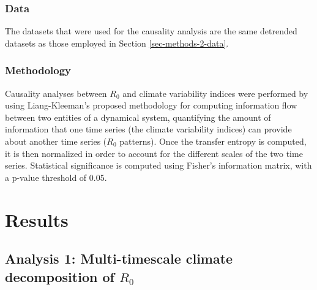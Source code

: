 \documentclass[10pt,twocolumn]{wlscirep}
\begin{document}
\subsubsection{Data} \label{sec-methods-3-data}

The datasets that were used for the causality analysis are the same detrended datasets as those employed in Section \ref{sec-methods-2-data}.

\subsubsection{Methodology} \label{sec-methods-3-methodology}

Causality analyses between $R_0$ and climate variability indices were performed by using Liang-Kleeman's proposed methodology for computing information flow between two entities of a dynamical system, quantifying the amount of information that one time series (the climate variability indices) can provide about another time series ($R_0$ patterns)\cite{liang_2014}. Once the transfer entropy is computed, it is then normalized in order to account for the different scales of the two time series\cite{liang_2015}. Statistical significance is computed using Fisher's information matrix, with a p-value threshold of 0.05.

\section{Results}
\subsection{Analysis 1: Multi-timescale climate decomposition of $R_0$} \label{sec-results-1}
\end{document}
